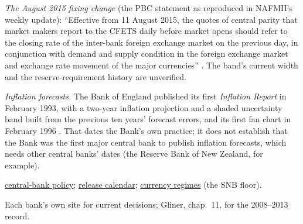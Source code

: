 \begin{qfrule}
\emph{The August 2015 fixing change} (the PBC statement as reproduced in NAFMII's weekly update): ``Effective from 11 August 2015, the quotes of central parity that market makers report to the CFETS daily before market opens should refer to the closing rate of the inter-bank foreign exchange market on the previous day, in conjunction with demand and supply condition in the foreign exchange market and exchange rate movement of the major currencies'' \citep[p.~1]{nafmii-2015-08-14}. The band's current width and the reserve-requirement history are unverified.

\emph{Inflation forecasts.} The Bank of England published its first \emph{Inflation Report} in February 1993, with a two-year inflation projection and a shaded uncertainty band built from the previous ten years' forecast errors, and its first fan chart in February 1996 \citep[pp.~30--31]{boe-qb-1998-fan-chart}. That dates the Bank's own practice; it does not establish that the Bank was the first major central bank to publish inflation forecasts, which needs other central banks' dates (the Reserve Bank of New Zealand, for example).

 \hyperref[def:central-bank-policy-framework]{central-bank policy}; \hyperref[data:us-macro-release-calendar]{release calendar}; \hyperref[def:currency-regimes-intervention]{currency regimes} (the SNB floor).

 Each bank's own site for current decisions; Gliner, chap.~11, for the 2008--2013 record.

\end{qfrule}

